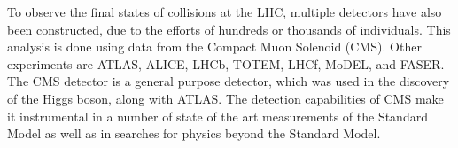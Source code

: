 To observe the final states of collisions at the LHC,
multiple detectors have also been constructed,
due to the efforts of hundreds or thousands of individuals.
This analysis is done using data from the Compact Muon Solenoid (CMS).
Other experiments are ATLAS, ALICE, LHCb, TOTEM, LHCf, MoDEL, and FASER.
The CMS detector is a general purpose detector,
which was used in the discovery of the Higgs boson, along with ATLAS.
The detection capabilities of CMS make it instrumental in a number of state of the art
measurements of the Standard Model as well as in searches for
physics beyond the Standard Model.
